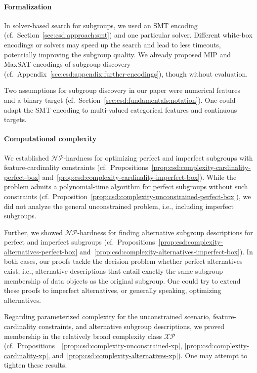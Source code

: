 \documentclass{article}
\theoremstyle{definition}
\begin{document}
\paragraph{Formalization}

In solver-based search for subgroups, we used an SMT encoding (cf.~Section~\ref{sec:csd:approach:smt}) and one particular solver.
Different white-box encodings or solvers may speed up the search and lead to less timeouts, potentially improving the subgroup quality.
We already proposed MIP and MaxSAT encodings of subgroup discovery (cf.~Appendix~\ref{sec:csd:appendix:further-encodings}), though without evaluation.

Two assumptions for subgroup discovery in our paper were numerical features and a binary target (cf.~Section~\ref{sec:csd:fundamentals:notation}).
One could adapt the SMT encoding to multi-valued categorical features and continuous targets.

\paragraph{Computational complexity}

We established $\mathcal{NP}$-hardness for optimizing perfect and imperfect subgroups with feature-cardinality constraints (cf.~Propositions~\ref{prop:csd:complexity-cardinality-perfect-box} and~\ref{prop:csd:complexity-cardinality-imperfect-box}).
While the problem admits a polynomial-time algorithm for perfect subgroups without such constraints (cf.~Proposition~\ref{prop:csd:complexity-unconstrained-perfect-box}), we did not analyze the general unconstrained problem, i.e., including imperfect subgroups.

Further, we showed $\mathcal{NP}$-hardness for finding alternative subgroup descriptions for perfect and imperfect subgroups (cf.~Propositions~\ref{prop:csd:complexity-alternatives-perfect-box} and~\ref{prop:csd:complexity-alternatives-imperfect-box}).
In both cases, our proofs tackle the decision problem whether perfect alternatives exist, i.e., alternative descriptions that entail exactly the same subgroup membership of data objects as the original subgroup.
One could try to extend these proofs to imperfect alternatives, or generally speaking, optimizing alternatives.

Regarding parameterized complexity for the unconstrained scenario, feature-cardinality constraints, and alternative subgroup descriptions, we proved membership in the relatively broad complexity class $\mathcal{XP}$ (cf.~Propositions~~\ref{prop:csd:complexity-unconstrained-xp}, \ref{prop:csd:complexity-cardinality-xp}, and~\ref{prop:csd:complexity-alternatives-xp}).
One may attempt to tighten these results.
\end{document}

